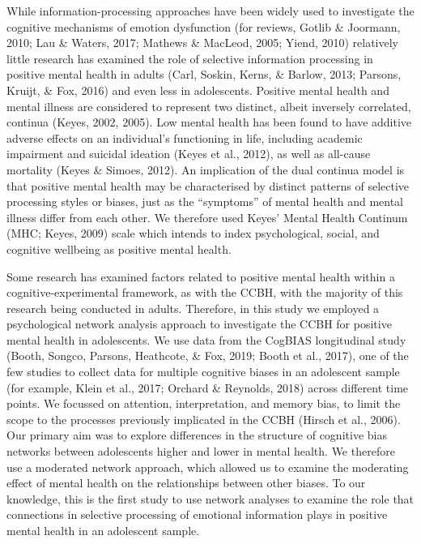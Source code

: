 \documentclass[man,floatsintext]{apa6}
\begin{document}
While information-processing approaches have been widely used to investigate the cognitive mechanisms of emotion dysfunction (for reviews, Gotlib \& Joormann, 2010; Lau \& Waters, 2017; Mathews \& MacLeod, 2005; Yiend, 2010) relatively little research has examined the role of selective information processing in positive mental health in adults (Carl, Soskin, Kerns, \& Barlow, 2013; Parsons, Kruijt, \& Fox, 2016) and even less in adolescents. Positive mental health and mental illness are considered to represent two distinct, albeit inversely correlated, continua (Keyes, 2002, 2005). Low mental health has been found to have additive adverse effects on an individual's functioning in life, including academic impairment and suicidal ideation (Keyes et al., 2012), as well as all-cause mortality (Keyes \& Simoes, 2012). An implication of the dual continua model is that positive mental health may be characterised by distinct patterns of selective processing styles or biases, just as the \enquote{symptoms} of mental health and mental illness differ from each other. We therefore used Keyes' Mental Health Continum (MHC; Keyes, 2009) scale which intends to index psychological, social, and cognitive wellbeing as positive mental health.

Some research has examined factors related to positive mental health within a cognitive-experimental framework, as with the CCBH, with the majority of this research being conducted in adults. Therefore, in this study we employed a psychological network analysis approach to investigate the CCBH for positive mental health in adolescents. We use data from the CogBIAS longitudinal study (Booth, Songco, Parsons, Heathcote, \& Fox, 2019; Booth et al., 2017), one of the few studies to collect data for multiple cognitive biases in an adolescent sample (for example, Klein et al., 2017; Orchard \& Reynolds, 2018) across different time points. We focussed on attention, interpretation, and memory bias, to limit the scope to the processes previously implicated in the CCBH (Hirsch et al., 2006). Our primary aim was to explore differences in the structure of cognitive bias networks between adolescents higher and lower in mental health. We therefore use a moderated network approach, which allowed us to examine the moderating effect of mental health on the relationships between other biases. To our knowledge, this is the first study to use network analyses to examine the role that connections in selective processing of emotional information plays in positive mental health in an adolescent sample.
\end{document}

